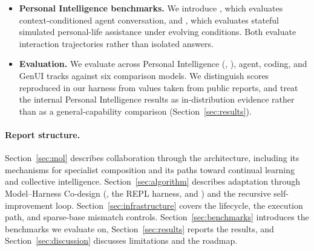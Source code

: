 \begin{itemize}[leftmargin=*]
  \item \textbf{Personal Intelligence benchmarks.}
  We introduce \chatbench{}, which evaluates context-conditioned agent
  conversation, and \livingbench{}, which evaluates stateful simulated
  personal-life assistance under evolving conditions. Both evaluate
  interaction trajectories rather than isolated answers.

  \item \textbf{Evaluation.}
  We evaluate \macaron{} across Personal Intelligence
  (\chatbench{}, \livingbench{}), agent, coding, and GenUI tracks
  against six comparison models. We distinguish scores reproduced in our
  harness from values taken from public reports, and treat the internal
  Personal Intelligence results as in-distribution evidence rather than as a
  general-capability comparison (Section~\ref{sec:results}).
\end{itemize}

\paragraph{Report structure.}
Section~\ref{sec:mol} describes collaboration through the \molshort{}
architecture, including its mechanisms for specialist composition and its
paths toward continual learning and collective intelligence.
Section~\ref{sec:algorithm} describes adaptation through Model--Harness
Co-design (\uifora{}, the REPL harness, and \hcp{}) and the recursive
self-improvement loop. Section~\ref{sec:infrastructure} covers the \mint{}
lifecycle, the \longstraw{} execution path, and sparse-base mismatch controls.
Section~\ref{sec:benchmarks} introduces the benchmarks we evaluate on,
Section~\ref{sec:results} reports the results, and
Section~\ref{sec:discussion} discusses limitations and the roadmap.
